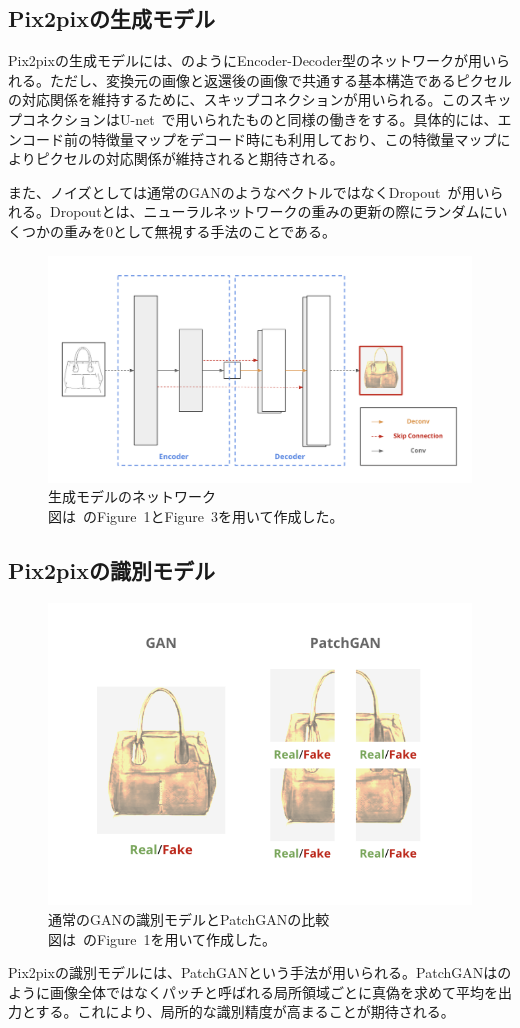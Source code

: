 \subsection{Pix2pixの生成モデル}

Pix2pixの生成モデルには、のようにEncoder-Decoder型のネットワークが用いられる。ただし、変換元の画像と返還後の画像で共通する基本構造であるピクセルの対応関係を維持するために、スキップコネクションが用いられる。このスキップコネクションはU-net~\cite{u-net}で用いられたものと同様の働きをする。具体的には、エンコード前の特徴量マップをデコード時にも利用しており、この特徴量マップによりピクセルの対応関係が維持されると期待される。

また、ノイズとしては通常のGANのようなベクトルではなくDropout~\cite{Dropout}が用いられる。Dropoutとは、ニューラルネットワークの重みの更新の際にランダムにいくつかの重みを0として無視する手法のことである。

\clearpage

\begin{figure}[t]
\centering
\includegraphics[width=0.8\columnwidth]{figure/u-net.png}
\caption[Pix2pixの生成モデル]{生成モデルのネットワーク\\
図は~\cite{pix2pix}のFigure~1とFigure~3を用いて作成した。}
\label{fig:u-net}
\end{figure}

\subsection{Pix2pixの識別モデル}

\begin{figure}[b]
\centering
\includegraphics[width=0.6\columnwidth]{figure/patchgan.png}
\caption[通常のGANの識別モデルとPatchGANの比較]{通常のGANの識別モデルとPatchGANの比較\\
図は~\cite{pix2pix}のFigure~1を用いて作成した。}
\label{fig:patchgan}
\end{figure}

Pix2pixの識別モデルには、PatchGANという手法が用いられる。PatchGANはのように画像全体ではなくパッチと呼ばれる局所領域ごとに真偽を求めて平均を出力とする。これにより、局所的な識別精度が高まることが期待される。
